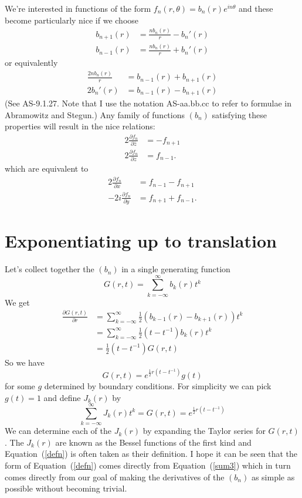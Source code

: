\documentclass{article}
\begin{document}
We're interested in functions of the form
$f_n(r,\theta)=b_n(r)e^{in\theta}$
and these become particularly nice if we choose
\begin{align*}
b_{n+1}(r) & = \frac{nb_n(r)}{r}-b_n'(r) \\
b_{n-1}(r) & = \frac{nb_n(r)}{r}+b_n'(r)
\end{align*}
or equivalently
\begin{align}
\frac{2nb_n(r)}{r} & =  b_{n-1}(r)+b_{n+1}(r) \label{sum} \\
2b_n'(r) & =  b_{n-1}(r)-b_{n+1}(r) \label{deriv}
\end{align}
(See AS-9.1.27. Note that I use the notation AS-aa.bb.cc to refer to formulae in Abramowitz and Stegun.)
Any family of functions $(b_n)$ satisfying these properties will result in the nice relations:
\begin{align*}
2\frac{\partial f_n}{\partial\bar{z}} & = -f_{n+1} \\
2\frac{\partial f_n}{\partial z} & = f_{n-1}.
\end{align*}
which are equivalent to
\begin{align}
2\frac{\partial f_n}{\partial x} & = f_{n-1}-f_{n+1} \label{sum3} \\
-2i\frac{\partial f_n}{\partial y} & = f_{n+1}+f_{n-1} \label{sum4}.
\end{align}

\section{Exponentiating up to translation}
Let's collect together the $(b_n)$ in a single generating function
\[
G(r,t) = \sum_{k=-\infty}^\infty b_k(r)t^k
\]
We get
\begin{align*}
\frac{\partial G(r,t)}{\partial r} &= \sum_{k=-\infty}^\infty \frac{1}{2}(b_{k-1}(r)-b_{k+1}(r))t^k\\
&= \sum_{k=-\infty}^\infty \frac{1}{2}(t-t^{-1})b_k(r)t^k \\
&= \frac{1}{2}(t-t^{-1})G(r,t)
\end{align*}
So we have
\[
G(r,t) = e^{\frac{1}{2}r(t-t^{-1})}g(t)
\]
for some $g$ determined by boundary conditions.
For simplicity we can pick $g(t) = 1$ and define $J_k(r)$ by
\begin{equation}
\boxed{\sum_{k=-\infty}^\infty J_k(r)t^k = G(r,t) = e^{\frac{1}{2}r(t-t^{-1})}}\label{defn}
\end{equation}
We can determine each of the $J_k(r)$ by expanding the Taylor series for $G(r, t)$.
The $J_k(r)$ are known as the Bessel functions of the first kind and Equation~(\ref{defn}) is often taken as their definition.
I hope it can be seen that the form of Equation~(\ref{defn}) comes directly from Equation~(\ref{sum3}) which in turn comes directly from our goal of making the derivatives of the $(b_n)$ as simple as possible without becoming trivial.
\end{document}
